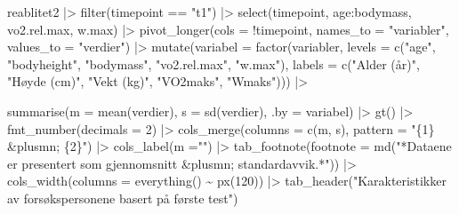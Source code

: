 \documentclass[
  letterpaper,
  DIV=11,
  numbers=noendperiod]{scrartcl}
\newenvironment{Shaded}{\begin{snugshade}}{\end{snugshade}}
\newcommand{\AttributeTok}[1]{\textcolor[rgb]{0.40,0.45,0.13}{#1}}
\newcommand{\DecValTok}[1]{\textcolor[rgb]{0.68,0.00,0.00}{#1}}
\newcommand{\FunctionTok}[1]{\textcolor[rgb]{0.28,0.35,0.67}{#1}}
\newcommand{\NormalTok}[1]{\textcolor[rgb]{0.00,0.23,0.31}{#1}}
\newcommand{\SpecialCharTok}[1]{\textcolor[rgb]{0.37,0.37,0.37}{#1}}
\newcommand{\StringTok}[1]{\textcolor[rgb]{0.13,0.47,0.30}{#1}}
\begin{document}
\begin{Shaded}
\begin{Highlighting}[]
\NormalTok{reablitet2 }\SpecialCharTok{|\textgreater{}} 
  \FunctionTok{filter}\NormalTok{(timepoint }\SpecialCharTok{==} \StringTok{"t1"}\NormalTok{) }\SpecialCharTok{|\textgreater{}} 
  \FunctionTok{select}\NormalTok{(timepoint, age}\SpecialCharTok{:}\NormalTok{bodymass, vo2.rel.max, w.max) }\SpecialCharTok{|\textgreater{}} 
  \FunctionTok{pivot\_longer}\NormalTok{(}\AttributeTok{cols =} \SpecialCharTok{!}\NormalTok{timepoint,}
               \AttributeTok{names\_to =} \StringTok{"variabler"}\NormalTok{, }
               \AttributeTok{values\_to =} \StringTok{"verdier"}\NormalTok{) }\SpecialCharTok{|\textgreater{}} 
  \FunctionTok{mutate}\NormalTok{(}\AttributeTok{variabel =} \FunctionTok{factor}\NormalTok{(variabler, }
                           \AttributeTok{levels =} \FunctionTok{c}\NormalTok{(}\StringTok{"age"}\NormalTok{, }
                                      \StringTok{"bodyheight"}\NormalTok{, }
                                      \StringTok{"bodymass"}\NormalTok{, }
                                      \StringTok{"vo2.rel.max"}\NormalTok{, }
                                      \StringTok{"w.max"}\NormalTok{), }
                           \AttributeTok{labels =} \FunctionTok{c}\NormalTok{(}\StringTok{"Alder (år)"}\NormalTok{, }
                                      \StringTok{"Høyde (cm)"}\NormalTok{, }
                                      \StringTok{"Vekt (kg)"}\NormalTok{, }
                                      \StringTok{"VO2maks"}\NormalTok{, }
                                      \StringTok{"Wmaks"}\NormalTok{)))  }\SpecialCharTok{|\textgreater{}} 
  
  \FunctionTok{summarise}\NormalTok{(}\AttributeTok{m =} \FunctionTok{mean}\NormalTok{(verdier), }
            \AttributeTok{s =} \FunctionTok{sd}\NormalTok{(verdier), }
            \AttributeTok{.by =}\NormalTok{ variabel) }\SpecialCharTok{|\textgreater{}} 
  \FunctionTok{gt}\NormalTok{() }\SpecialCharTok{|\textgreater{}} 
  \FunctionTok{fmt\_number}\NormalTok{(}\AttributeTok{decimals =} \DecValTok{2}\NormalTok{) }\SpecialCharTok{|\textgreater{}} 
  \FunctionTok{cols\_merge}\NormalTok{(}\AttributeTok{columns =} \FunctionTok{c}\NormalTok{(m, s), }
             \AttributeTok{pattern =} \StringTok{"\{1\} \&plusmn; \{2\}"}\NormalTok{) }\SpecialCharTok{|\textgreater{}} 
  \FunctionTok{cols\_label}\NormalTok{(}\AttributeTok{m =}\StringTok{""}\NormalTok{) }\SpecialCharTok{|\textgreater{}} 
  \FunctionTok{tab\_footnote}\NormalTok{(}\AttributeTok{footnote =} \FunctionTok{md}\NormalTok{(}\StringTok{"*Dataene er presentert som gjennomsnitt \&plusmn; }
\StringTok{                             standardavvik.*"}\NormalTok{)) }\SpecialCharTok{|\textgreater{}} 
  \FunctionTok{cols\_width}\NormalTok{(}\AttributeTok{columns =} \FunctionTok{everything}\NormalTok{() }\SpecialCharTok{\textasciitilde{}} \FunctionTok{px}\NormalTok{(}\DecValTok{120}\NormalTok{)) }\SpecialCharTok{|\textgreater{}} 
  \FunctionTok{tab\_header}\NormalTok{(}\StringTok{"Karakteristikker av forsøkspersonene basert på første test"}\NormalTok{) }
\end{Highlighting}
\end{Shaded}
\end{document}
